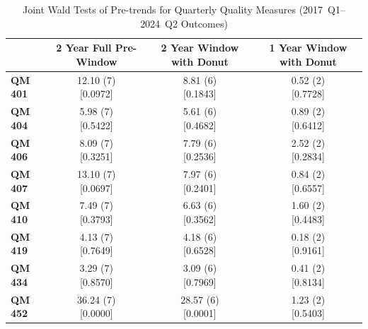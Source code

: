 \documentclass[11pt]{article}
\begin{document}
\begingroup
\begin{table}[!ht]
\centering
\begin{threeparttable}
\caption{Joint Wald Tests of Pre-trends for Quarterly Quality Measures (2017~Q1--2024~Q2 Outcomes)}
\label{tab:q_pretrend_wald_full}
\small
\setlength{\tabcolsep}{8pt}

\begin{tabular}{@{}lccc@{}}
\toprule
& \textbf{2 Year Full Pre-Window} & \textbf{2 Year Window with Donut} & \textbf{1 Year Window with Donut} \\
\midrule
\textbf{QM 401} & \makecell[c]{12.10 (7) \\ {[0.0972]}} & \makecell[c]{8.81 (6) \\ {[0.1843]}} & \makecell[c]{0.52 (2) \\ {[0.7728]}} \\
\textbf{QM 404} & \makecell[c]{5.98 (7) \\ {[0.5422]}} & \makecell[c]{5.61 (6) \\ {[0.4682]}} & \makecell[c]{0.89 (2) \\ {[0.6412]}} \\
\textbf{QM 406} & \makecell[c]{8.09 (7) \\ {[0.3251]}} & \makecell[c]{7.79 (6) \\ {[0.2536]}} & \makecell[c]{2.52 (2) \\ {[0.2834]}} \\
\textbf{QM 407} & \makecell[c]{13.10 (7) \\ {[0.0697]}} & \makecell[c]{7.97 (6) \\ {[0.2401]}} & \makecell[c]{0.84 (2) \\ {[0.6557]}} \\
\textbf{QM 410} & \makecell[c]{7.49 (7) \\ {[0.3793]}} & \makecell[c]{6.63 (6) \\ {[0.3562]}} & \makecell[c]{1.60 (2) \\ {[0.4483]}} \\
\textbf{QM 419} & \makecell[c]{4.13 (7) \\ {[0.7649]}} & \makecell[c]{4.18 (6) \\ {[0.6528]}} & \makecell[c]{0.18 (2) \\ {[0.9161]}} \\
\textbf{QM 434} & \makecell[c]{3.29 (7) \\ {[0.8570]}} & \makecell[c]{3.09 (6) \\ {[0.7969]}} & \makecell[c]{0.41 (2) \\ {[0.8134]}} \\
\textbf{QM 452} & \makecell[c]{36.24 (7) \\ {[0.0000]}} & \makecell[c]{28.57 (6) \\ {[0.0001]}} & \makecell[c]{1.23 (2) \\ {[0.5403]}} \\
\bottomrule
\end{tabular}


\end{threeparttable}
\end{table}
\end{document}
